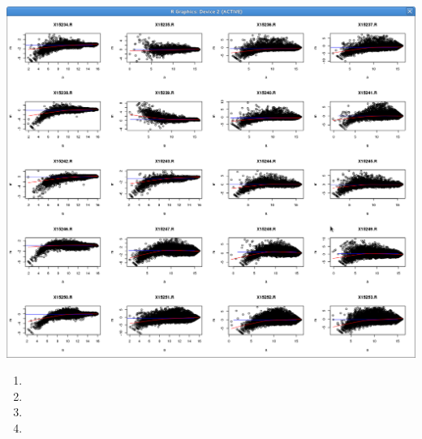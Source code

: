 \documentclass{homework}
\begin{document}
\begin{enumerate}
\includegraphics[scale=0.3]{../data/aufg_37}


\begin{enumerate}
\item 
\item 
\item
\item
\end{enumerate}

\end{enumerate}
\end{document}
